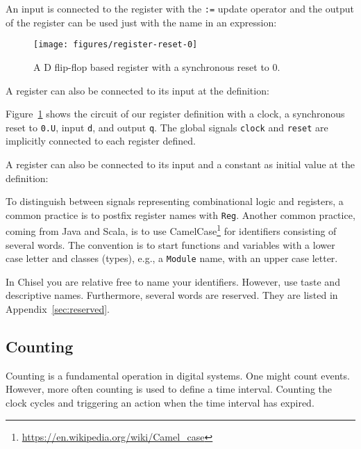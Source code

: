 \documentclass[%
    10pt,
    headinclude, footexclude,
    openright, %
    notitlepage,
    cleardoubleempty,
    headsepline,
    pointlessnumbers,
    bibtotoc, idxtotoc,
    ]{scrbook}
\newcommand{\scale}{0.7}
\newcommand{\code}[1]{{\lstinline[basicstyle=\small\ttfamily]{#1}}}
\newcommand{\myref}[2]{\href{#1}{#2}}
\renewcommand{\myref}[2]{{#2}{\footnote{\url{#1}}}}
\begin{document}

\noindent An input is connected to the register with the \code{:=} update operator and
the output of the register can be used just with the name in an expression:


\begin{figure}
  \centering
  \texttt{[image: figures/register-reset-0]}
  \caption{A D flip-flop based register with a synchronous reset to 0.}
  \label{fig:register-reset-0}
\end{figure}

\noindent A register can also be connected to its input at the definition:


Figure~\ref{fig:register-reset-0} shows the circuit of our register definition with
a clock, a synchronous reset to \code{0.U}, input \code{d}, and output \code{q}.
The global signals \code{clock} and \code{reset} are implicitly connected to
each register defined.

\noindent A register can also be connected to its input and a constant as
initial value at the definition:


\noindent To distinguish between signals representing combinational logic and registers,
a common practice is to postfix register names with \code{Reg}.
Another common practice, coming from Java and Scala, is to use
\myref{https://en.wikipedia.org/wiki/Camel_case}{CamelCase} for
identifiers consisting of several words. The convention is to start
functions and variables with a lower case letter and classes (types),
e.g., a \code{Module} name, with an upper case letter.

In Chisel you are relative free to name your identifiers. However, use taste and
descriptive names. Furthermore, several words are reserved. They are listed
in Appendix~\ref{sec:reserved}.




\subsection{Counting}

Counting is a fundamental operation in digital systems. One might count events.
However, more often counting is used to define a time interval. Counting the
clock cycles and triggering an action when the time interval has expired.
\end{document}
